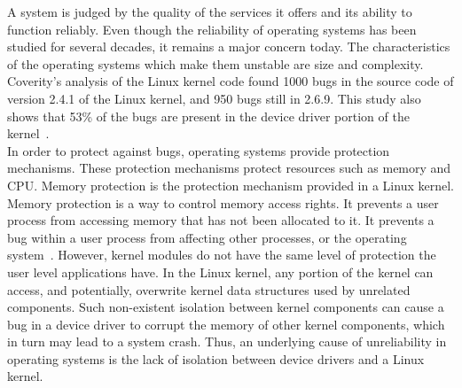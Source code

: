 A system is judged by the quality of the services it offers and its ability to function reliably. Even though the reliability of operating systems has been studied for several decades, it remains a major concern today. The characteristics of the operating systems which make them unstable are size and complexity. 
\\[3mm]
Coverity's analysis of the Linux kernel code found 1000 bugs in the source code of version 2.4.1 of the Linux kernel, and 950 bugs still in 2.6.9. This study also shows that 53\% of the bugs are present in the device driver portion of the kernel~\cite{coveritykernel}. 
\\[3mm]
In order to protect against bugs, operating systems provide protection mechanisms. These protection mechanisms protect resources such as memory and CPU.
Memory protection is the protection mechanism provided in a Linux kernel. Memory protection is a way to control memory access rights. It prevents a user process from accessing memory that has not been allocated to it. It prevents a bug within a user process from affecting other processes, or the operating system~\cite{Denning:1970:VM:356571.356573, Galvin}. However, kernel modules do not have the same level of protection the user level applications have. In the Linux kernel, any portion of the kernel can access, and potentially, overwrite kernel data structures used by unrelated components. Such non-existent isolation between kernel components can cause a bug in a device driver to corrupt the memory of other kernel components, which in turn may lead to a system crash. Thus, an underlying cause of unreliability in operating systems is the lack of isolation between device drivers and a Linux kernel.

